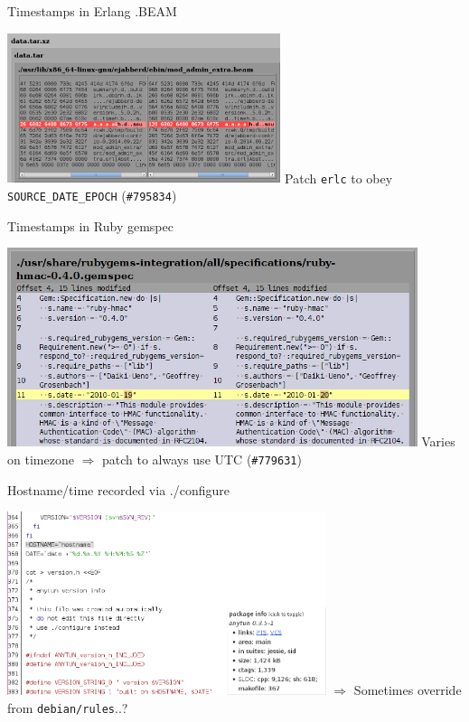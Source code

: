 \documentclass[14pt,aspectratio=169]{beamer}
\begin{document}

\begin{frame}{Timestamps in Erlang .BEAM}
 \begin{center}
  \includegraphics[width=0.6\textwidth]{images/examples/timestamps_in_beam.png}
  \vfill
  \vfill
  Patch \texttt{erlc} to obey \texttt{SOURCE\_DATE\_EPOCH} (\texttt{\#795834})
 \end{center}
\end{frame}

\begin{frame}{Timestamps in Ruby gemspec}
 \begin{center}
  \includegraphics[width=0.9\textwidth]{images/examples/timestamps_in_ruby_gemspec.png}
  \vfill
  Varies on timezone $\Longrightarrow$ patch to always use UTC (\texttt{\#779631})
 \end{center}
\end{frame}


\begin{frame}{Hostname/time recorded via ./configure}
 \begin{center}
  \includegraphics[width=0.7\textwidth]{images/examples/hostname_in_configure.png}
  \vfill
  $\Longrightarrow$ Sometimes override from \texttt{debian/rules}..?
 \end{center}
\end{frame}
\end{document}
